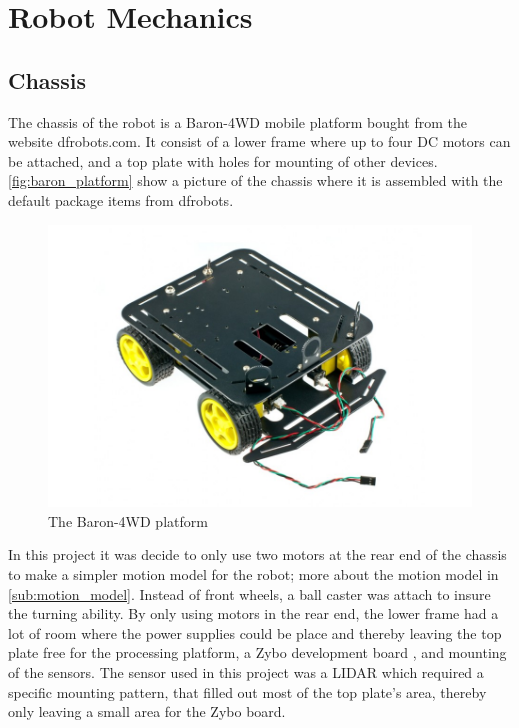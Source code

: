 \documentclass[Main]{subfiles}
\begin{document}
\section{Robot Mechanics} %
	\label{sec:robot_mechanics}

	\subsection{Chassis} %
		\label{sub:chassis}
The chassis of the robot is a Baron-4WD mobile platform bought from the website dfrobots.com. 
It consist of a lower frame where up to four DC motors can be attached, and a top plate with holes for mounting of other devices. 
\autoref{fig:baron_platform} show a picture of the chassis where it is assembled with the default package items from dfrobots.
\begin{figure}[H]
	\centering
	\includegraphics[scale=0.5]{./Figures/baron_platform.jpg}
	\caption{The Baron-4WD platform}
	\label{fig:baron_platform}
\end{figure}\noindent
In this project it was decide to only use two motors at the rear end of the chassis to make a simpler motion model for the robot; more about the motion model in \autoref{sub:motion_model}. 
Instead of front wheels, a ball caster was attach to insure the turning ability. 
By only using motors in the rear end, the lower frame had a lot of room where the power supplies could be place and thereby leaving the top plate free for the processing platform, a Zybo development board , and mounting of the sensors. 
The sensor used in this project was a LIDAR  which required a specific mounting pattern, that filled out most of the top plate's area, thereby only leaving a small area for the Zybo board. 
\end{document}
